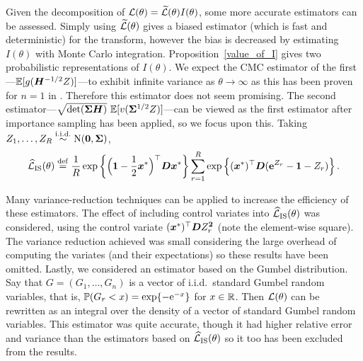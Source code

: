 Given the decomposition of $\mathcal{L}(\theta) = \widetilde{\mathcal{L}}(\theta)
I(\theta)$, some more accurate estimators can be assessed. Simply using
$\widetilde{\mathcal{L}}(\theta)$ gives a biased estimator (which is fast and
deterministic) for the transform, however the bias is decreased by estimating
$I(\theta)$ with Monte Carlo integration. Proposition~\ref{value_of_I} gives
two probabilistic representations of $I(\theta)$. We expect the CMC estimator
of the first---$\operatorname{{\mathbb E}}[g(\bm{H}^{-1/2}Z)
]$---to exhibit infinite variance as $\theta \to \infty$ as this has been
proven for $n=1$ in \cite{asmussen2014laplace}. Therefore this estimator does
not seem promising. The second estimator---$\sqrt{\det(\bm{\Sigma}
  \bm{H})} \, \operatorname{{\mathbb E}}[ v(\bm{\Sigma}^{1/2} Z) ]$---can be viewed as the first
estimator after importance sampling has been applied, so we focus upon
this. Taking $Z_1, \dots, Z_R \overset{\mathrm{i.i.d.}}{\sim} \mathrm{N}(\bm{0}, \bm{\Sigma})$,
%
\[ \widehat{\mathcal{L}}_{\mathrm{IS}}(\theta) \overset{\mathrm{def}}{=} \frac{1}{R}
  \exp\left\{ \Big(\bm{1} - \frac12 \bm{x}^* \Big)^\top \bm{D} \bm{x}^* \right\}
  \sum_{r=1}^R \exp\left\{ (\bm{x}^*)^\top \bm{D} (\bm{\mathrm{e}}^{Z_r} - \bm{1} - Z_r)
  \right\}. \]

Many variance-reduction techniques can be applied to increase the efficiency
of these estimators. The effect of including control variates into
$\widehat{\mathcal{L}}_{\mathrm{IS}}(\theta)$ was considered, using the control
variate $(\bm{x}^*)^\top \bm{D} Z_r^{\bm{2}}$ (note the element-wise square). The
variance reduction achieved was small considering the large overhead of
computing the variates (and their expectations) so these results have been
omitted. Lastly, we considered an estimator based on the Gumbel
distribution. Say that $G = (G_1, \dots, G_n)$ is a vector of i.i.d.\ standard
Gumbel random variables, that is, $\operatorname{{\mathbb P}}(G_r < x) = \exp\{ -\mathrm{e}^{-x} \}$ for
$x \in \mathbb{R}$. Then $\mathcal{L}(\theta)$ can be rewritten as an integral over the
density of a vector of standard Gumbel random variables. This estimator was
quite accurate, though it had higher relative error and variance than the
estimators based on $\widehat{\mathcal{L}}_{\mathrm{IS}}(\theta)$ so it too has
been excluded from the results.

